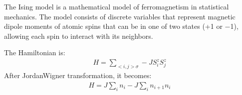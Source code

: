 \documentclass[letterpaper,10pt,english]{sphinxmanual}
\begin{document}
The Ising model is a mathematical model of ferromagnetism in statistical mechanics. The
model consists of discrete variables that represent magnetic dipole moments of atomic
spins that can be in one of two states (+1 or −1), allowing each spin to interact
with its neighbors.

The Hamiltonian is:
\begin{equation*}
\begin{split}H=\sum_{<i,j> \sigma}-JS^{z}_{i}S^{z}_{j}\end{split}
\end{equation*}
After Jordan\textendash{}Wigner transformation, it becomes:
\begin{equation*}
\begin{split}H = J\sum_{i}n_{i} - J\sum_{i}n_{i+1}n_{i}\end{split}
\end{equation*}
\def\sphinxLiteralBlockLabel{\label{\detokenize{user_model_system:id8}}}
%
\end{document}
